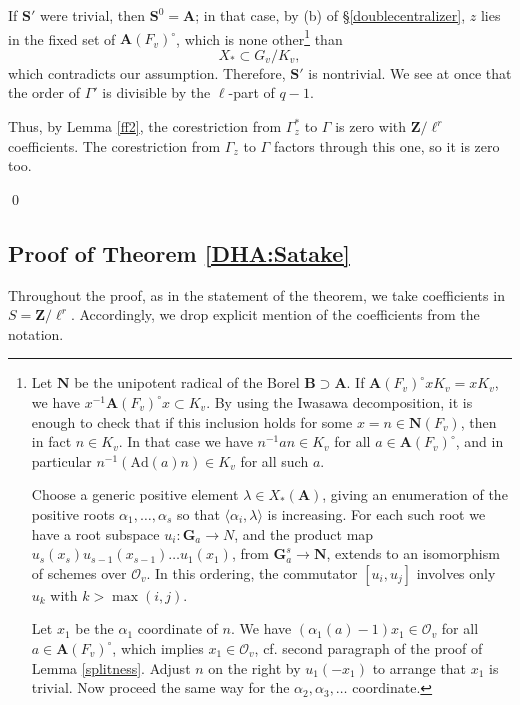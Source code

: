 \documentclass[10pt]{amsart}
\newcommand{\Z}{\mathbf{Z}}
\newcommand{\Ad}{\mathrm{Ad}}
\theoremstyle{remark}
\begin{document}
If $\mathbf{S}'$ were trivial, then $\mathbf{S}^0 = \mathbf{A}$;   in that case,  by (b) of \S \ref{doublecentralizer}, 
$z$ lies in the fixed set of $\mathbf{A}(F_v)^{\circ}$, which is none other\footnote{ Let $\mathbf{N}$ be the unipotent radical of the Borel $\mathbf{B} \supset \mathbf{A}$. 
If $\mathbf{A}(F_v)^{\circ} x K_v = x K_v$, we have  $x^{-1} \mathbf{A}(F_v)^{\circ} x \subset K_v$.
By using the Iwasawa decomposition, it is enough to check that if this inclusion holds
 for some $x=n \in \mathbf{N}(F_v)$, then in fact $n \in K_v$.   
 In that case we have $n^{-1}  a  n \in K_v$   for all $a \in \mathbf{A}(F_v)^{\circ}$,
 and in particular $n^{-1} ( \Ad(a) n) \in K_v$ for all such $a$.
 
Choose a generic positive element $\lambda \in X_*(\mathbf{A})$, giving an enumeration of the positive roots $\alpha_1, \dots, \alpha_s$
so that $\langle \alpha_i, \lambda \rangle$ is increasing. 
For each such root
 we have a root subspace $u_{i}: \mathbf{G}_a \rightarrow
 N$, and the product map  $u_s(x_s) u_{s-1}(x_{s-1}) \dots u_1(x_1)$, 
 from $\mathbf{G}_a^s \rightarrow \mathbf{N}$, 
extends to an isomorphism
 of  schemes    over $\mathcal{O}_v$. In this ordering, the commutator
$[u_{i}, u_j]$ involves only $u_{k}$ with $k > \max(i,j)$. 
 
Let $x_1$ be the $\alpha_1$ coordinate of $n$. We have $(\alpha_1(a)-1) x_1 \in \mathcal{O}_v$
 for all $a \in \mathbf{A}(F_v)^{\circ}$, which implies $x_1 \in \mathcal{O}_v$, cf.  second paragraph of the proof of Lemma 
\ref{splitness}. Adjust $n$ on the right by $u_{1}(-x_1)$
 to arrange that $x_1$ is trivial. Now proceed the same way for the $\alpha_2, \alpha_3, \dots$ coordinate. 
 } than 
$$X_* \subset G_v/K_v,$$
which contradicts our assumption. Therefore, $\mathbf{S}'$ is nontrivial. We see at once that the order of $\Gamma'$ is divisible
by the $\ell$-part of $q-1$.

Thus, by Lemma \ref{ff2}, the corestriction from $\Gamma_z^*$ to $\Gamma$ is zero with $\Z/\ell^r$ coefficients. 
The corestriction from $\Gamma_z$ to $\Gamma$ factors through this one, so it is zero too. 


%
%
%
%
%
%
%
%
%
%
 
  
  \qed

  
  
 
\subsection{Proof of Theorem   \ref{DHA:Satake}}\label{Satake algebra proof}
Throughout the proof, as in the statement of the theorem, we take coefficients in $S = \Z/\ell^r$. Accordingly, we drop explicit
mention of the coefficients from the notation. 
 
\end{document}
